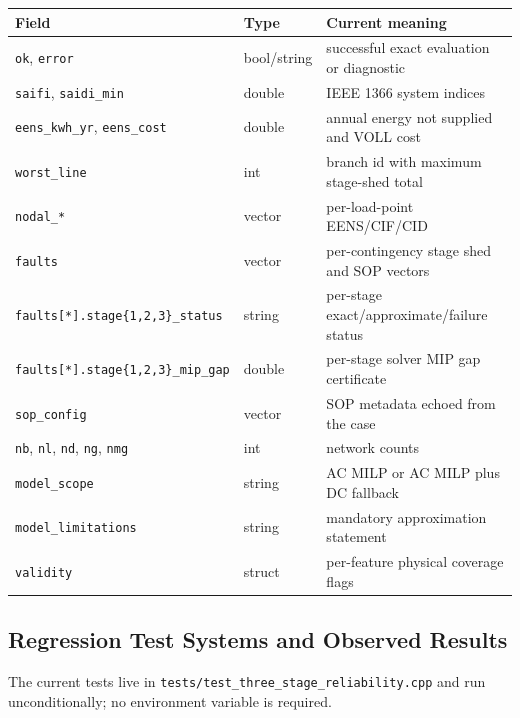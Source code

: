 \begin{center}
\begin{tabular}{lll}
\hline
Field & Type & Current meaning \\
\hline
\texttt{ok}, \texttt{error} & bool/string & successful exact evaluation or diagnostic \\
\texttt{saifi}, \texttt{saidi\_min} & double & IEEE 1366 system indices \\
\texttt{eens\_kwh\_yr}, \texttt{eens\_cost} & double & annual energy not supplied and VOLL cost \\
\texttt{worst\_line} & int & branch id with maximum stage-shed total \\
\texttt{nodal\_*} & vector & per-load-point EENS/CIF/CID \\
\texttt{faults} & vector & per-contingency stage shed and SOP vectors \\
\texttt{faults[*].stage\{1,2,3\}\_status} & string & per-stage exact/approximate/failure status \\
\texttt{faults[*].stage\{1,2,3\}\_mip\_gap} & double & per-stage solver MIP gap certificate \\
\texttt{sop\_config} & vector & SOP metadata echoed from the case \\
\texttt{nb}, \texttt{nl}, \texttt{nd}, \texttt{ng}, \texttt{nmg} & int & network counts \\
\texttt{model\_scope} & string & AC MILP or AC MILP plus DC fallback \\
\texttt{model\_limitations} & string & mandatory approximation statement \\
\texttt{validity} & struct & per-feature physical coverage flags \\
\hline
\end{tabular}
\end{center}

\subsection{Regression Test Systems and Observed Results}
\label{sec:3stage-test-systems}

The current tests live in \texttt{tests/test\_three\_stage\_reliability.cpp} and
run unconditionally; no environment variable is required.

